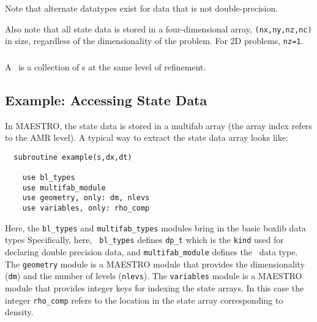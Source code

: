 Note that alternate datatypes exist for data that is not
double-precision.

Also note that all state data is stored in a four-dimensional array,
{\tt (nx,ny,nz,nc)} in size, regardless of the dimensionality of the
problem.  For 2D problems, {\tt nz=1}.

\subsubsection{\multifab}

A \multifab\ is a collection of \fab s at the same level of
refinement.

\subsubsection{\boxarray}

\subsubsection{\mlboxarray}

\subsubsection{\mllayout}

\subsubsection{\bctower}


\subsection{Example: Accessing State Data}

In MAESTRO, the state data is stored in a multifab array (the array
index refers to the AMR level).  A typical way to extract the state data
array looks like:

\begin{verbatim}
  subroutine example(s,dx,dt)

    use bl_types
    use multifab_module
    use geometry, only: dm, nlevs
    use variables, only: rho_comp
\end{verbatim}

\noindent Here, the {\tt bl\_types} and {\tt multifab\_types} modules
bring in the basic boxlib data types Specifically, here, {\tt
bl\_types} defines {\tt dp\_t} which is the {\tt kind} used for
declaring double precision data, and {\tt multifab\_module} defines
the \multifab\ data type.  The {\tt geometry} module is a MAESTRO
module that provides the dimensionality ({\tt dm}) and the number of 
levels ({\tt nlevs}).  The {\tt variables} module is a MAESTRO
module that provides integer keys for indexing the state arrays.  In
this case the integer {\tt rho\_comp} refers to the location in the
state array corresponding to density.

